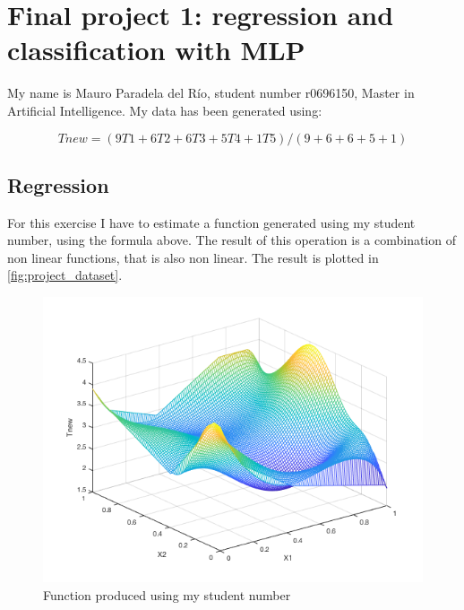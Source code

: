 \documentclass[a4paper, 10pt]{article}
\begin{document}
  \newpage
\section{Final project 1: regression and classification with MLP}
My name is Mauro Paradela del Río, student number r0696150, Master in Artificial
Intelligence. My data has been generated using:

$$ Tnew = (9T1 + 6T2 + 6T3 + 5T4 + 1T5) / (9 + 6 + 6+ 5 + 1) $$

  \subsection{Regression}
  For this exercise I have to estimate a function generated using my student
  number, using the formula above. The result of this operation is a combination
  of non linear functions, that is also non linear. The result is plotted in 
  \autoref{fig:project_dataset}.
  \begin{figure}[htb]
    \centering
    \includegraphics[width=0.5\linewidth]{project/dataset.png}
    \caption{Function produced using my student number}
    \label{fig:project_dataset}
  \end{figure}
\end{document}
